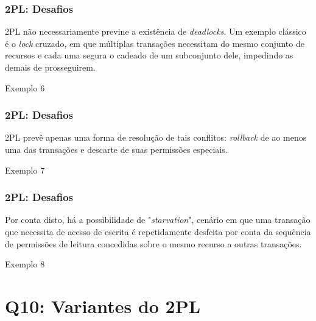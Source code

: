 \documentclass{beamer}
\begin{document}

\begin{frame}
    \frametitle{2PL: Desafios}

    2PL não necessariamente previne a existência de \emph{deadlocks}. Um exemplo clássico é o \emph{lock} cruzado, em que múltiplas transações necessitam do mesmo conjunto de recursos e cada uma segura o cadeado de um subconjunto dele, impedindo as demais de prosseguirem.

    \medskip
    \begin{example}{Exemplo 6}
    \end{example}
\end{frame}


\begin{frame}
    \frametitle{2PL: Desafios}
    2PL prevê apenas uma forma de resolução de tais conflitos: \emph{rollback} de ao menos uma das transações e descarte de suas permissões especiais.

    \medskip
    \begin{example}{Exemplo 7}
    \end{example}
\end{frame}


\begin{frame}
    \frametitle{2PL: Desafios}
    Por conta disto, há a possibilidade de "\emph{starvation}", cenário em que uma transação que necessita de acesso de escrita é repetidamente desfeita por conta da sequência de permissões de leitura concedidas sobre o mesmo recurso a outras transações.

    \medskip
    \begin{example}{Exemplo 8}
    \end{example}
\end{frame}

\section{Q10: Variantes do 2PL}
\end{document}
